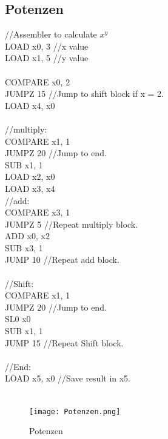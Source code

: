\documentclass{scrartcl}
\begin{document}
\subsection{Potenzen}
\begin{multicols}{2}
//Assembler to calculate $x^y$\\
LOAD x0, 3 //x value\\
LOAD x1, 5 //y value\\
\\
COMPARE x0, 2\\
JUMPZ 15 //Jump to shift block if x = 2.\\
LOAD x4, x0\\
\\
//multiply:\\
COMPARE x1, 1\\
JUMPZ 20 //Jump to end.\\
SUB x1, 1\\
LOAD x2, x0\\
LOAD x3, x4\\
//add:\\
COMPARE x3, 1\\
JUMPZ 5 //Repeat multiply block.\\
ADD x0, x2\\
SUB x3, 1\\
JUMP 10 //Repeat add block.\\
\\
//Shift:\\
COMPARE x1, 1\\
JUMPZ 20 //Jump to end.\\
SL0 x0\\
SUB x1, 1\\
JUMP 15 //Repeat Shift block.\\
\\
//End:\\
LOAD x5, x0 //Save result in x5.\\
\\
\end{multicols}
\begin{figure}[H]
    \centering
    \texttt{[image: Potenzen.png]}
    \caption{Potenzen}
    \label{fig:Potenzen}
\end{figure}
\newpage
\end{document}
